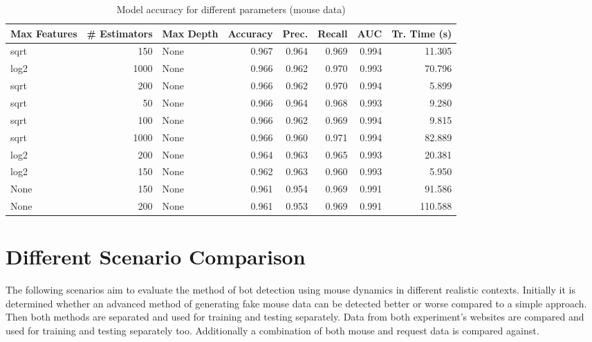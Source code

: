\documentclass[
    fontsize=12pt,
    headings=small,
    parskip=half,           %
    bibliography=totoc,
    numbers=noenddot,       %
    open=any,               %
    final,                   %
    table
]{scrreprt}
\begin{document}
\begin{table}[H]
    \begin{center}
        \begin{tabular}{lrlrrrrr}
            \toprule Max Features & \# Estimators & Max Depth & Accuracy & Prec. & Recall & AUC & Tr. Time (s) \\
            \midrule
            sqrt & 150 & None & 0.967 & 0.964 & 0.969 & 0.994 & 11.305 \\
            log2 & 1000 & None & 0.966 & 0.962 & 0.970 & 0.993 & 70.796 \\
            \rowcolor{green!30}
            sqrt & 200 & None & 0.966 & 0.962 & 0.970 & 0.994 & 5.899 \\
            sqrt & 50 & None & 0.966 & 0.964 & 0.968 & 0.993 & 9.280 \\
            sqrt & 100 & None & 0.966 & 0.962 & 0.969 & 0.994 & 9.815 \\
            sqrt & 1000 & None & 0.966 & 0.960 & 0.971 & 0.994 & 82.889 \\
            log2 & 200 & None & 0.964 & 0.963 & 0.965 & 0.993 & 20.381 \\
            log2 & 150 & None & 0.962 & 0.963 & 0.960 & 0.993 & 5.950 \\
            None & 150 & None & 0.961 & 0.954 & 0.969 & 0.991 & 91.586 \\
            None & 200 & None & 0.961 & 0.953 & 0.969 & 0.991 & 110.588 \\
            \bottomrule
        \end{tabular}
    \end{center}
    \caption{Model accuracy for different parameters (mouse data)}
    \label{table:mouse_params}
\end{table}

\section{Different Scenario Comparison}

The following scenarios aim to evaluate the method of bot detection using mouse dynamics in different realistic contexts. Initially it is determined whether an advanced method of generating fake mouse data can be detected better or worse compared to a simple approach. Then both methods are separated and used for training and testing separately. Data from both experiment's websites are compared and used for training and testing separately too. Additionally a combination of both mouse and request data is compared against.
\end{document}
